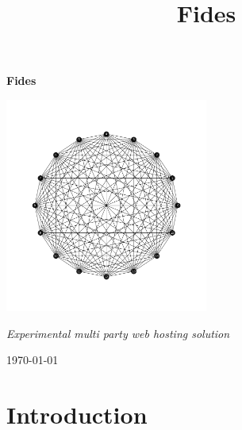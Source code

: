 \documentclass{paper}
\begin{document}
\pagestyle{plain}
\begin{titlepage}
	\centering
	
	\vspace{2.5cm}
	{\huge\bfseries Fides\par}
	\vspace{1cm}
  \includegraphics[width=0.5\textwidth]{16_nodes_fully_connected.png}\par\vspace{1cm}
	{\Large\itshape Experimental multi party web hosting solution\par\vspace{1cm}}


  \par\vspace{1cm}
	{\large \today\par}
\end{titlepage}

\title{Fides}
\tableofcontents
\newpage

\section{Introduction}
\end{document}
